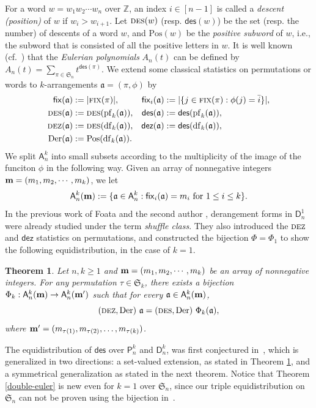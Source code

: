 \documentclass[12pt]{amsart} %
\numberwithin{equation}{section}
\theoremstyle{plain}
\newtheorem{theorem}{Theorem}[section]
\theoremstyle{definition}
\newcommand{\Z}{\mathbb{Z}}
\newcommand\A{\mathsf{A}}
\renewcommand\P{\mathsf{P}}
\newcommand\D{\mathsf{D}}
\def\dez{\mathsf{dez}}
\def\Der{\mathrm{Der}}
\def\DES{\hbox{\rm\textsc{des}}}
\def\DEZ{\hbox{\rm\textsc{dez}}}
\def\Pos{\mathrm{Pos}}
\def\Fix{\hbox{\rm\textsc{fix}}}
\def\fix{\mathsf{fix}}
\def\des{\mathsf{des}}
\def\S{\mathfrak{S}}
\def\a{\mathfrak{a}}
\def\df{\operatorname{df}}
\def\pf{\operatorname{pf}}
\def\neg#1{{{{\bar#1}}}}
\begin{document}
For a word $w=w_1w_2\cdots w_n$ over $\Z$, an index $i\in[n-1]$ is called a 
{\it descent (position)} of $w$ if $w_i>w_{i+1}$. 
Let $\DES(w)$ (resp. $\des(w)$) be the set (resp. the number) of descents of a word $w$, and $\Pos(w)$ be the {\em positive subword} of $w$, i.e., the subword that is consisted of all the positive letters in $w$. It is well known (cf.~\cite{fs}) that the {\em Eulerian polynomials} $A_n(t)$ can be defined by
$ A_n(t)=\sum_{\pi\in\S_n}t^{\des(\pi)} $.
We extend some classical statistics on 
permutations or words
to  $k$-arrangements $\a=(\pi, \phi)$ by 
\begin{align*}
\fix(\a)&:=|\Fix(\pi)|, & \fix_i(\a)&:=|\{j\in\Fix(\pi):\phi(j)=\neg i\}|, \\
\DES(\a)&:=\DES(\pf_k(\a)), &     \des(\a)&:=\des(\pf_k(\a)),\\
\DEZ(\a)&:=\DES(\df_k(\a)),  &    \dez(\a)&:=\des(\df_k(\a)),\\
\Der(\a)&:=\Pos(\df_k(\a)).  &
\end{align*}
%
We split $\A_n^k$ into small subsets according to the multiplicity of the image of the funciton $\phi$ in the following way.
Given an array of nonnegative integers ${\bf m}=(m_1, m_2, \cdots, m_k)$,
we let 
$$
\A_n^k({\bf m}) := \{
	\a \in \A_n^k : \fix_i(\a)=m_i  \text{\ for $1\leq i\leq k$}
\}.
$$
In the previous work of Foata and the second author \cite{fh1,fh3},  derangement forms in $\D_n^1$ were already studied under the term {\em shuffle class}.
They also introduced the $\DEZ$ and $\dez$ statistics on permutations,
and constructed the bijection $\Phi=\Phi_1$ to show the following equidistribution, in the case of $k=1$.

\begin{theorem}\label{euler:k-set}
Let $n,k\geq1$ and 
${\bf m}=(m_1, m_2, \cdots, m_k)$ be an array of nonnegative integers.
For any permutation $\tau\in \S_k$,
	there exists a bijection $\Phi_k: \A_n^k({\bf m}) \rightarrow \A_n^k({\bf m'})$ such that for every $\a\in\A_n^k(\bf m)$,
\begin{equation}\label{eq:equieuler}
(\DEZ,  \Der)~\a = (\DES,  \Der)~\Phi_k(\a),
\end{equation}
	where ${\bf m'} = (m_{\tau(1)}, m_{\tau(2)}, \ldots, m_{\tau(k)})$.
\end{theorem}
The equidistribution of $\des$ over
$\P_n^k$ and $\D_n^k$, 
was first conjectured in~\cite[Conj.~1]{bs}, 
which is generalized in two directions:
a set-valued extension, as stated in
Theorem \ref{euler:k-set},  
and a symmetrical
generalization as stated in the next theorem.
Notice that Theorem \ref{double-euler}
is new even for $k=1$ over $\S_n$, since our triple
equidistribution on $\S_n$ can not be proven using the bijection in~\cite[Thm.~1.1]{fh1}.
\end{document}
